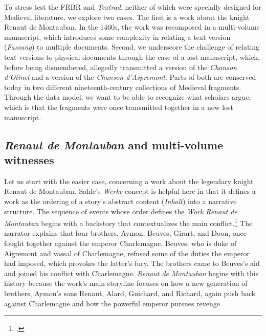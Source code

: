 To stress test the FRBR and \textit{Textrad}, neither of which were specially designed for Medieval literature, we explore two cases. The first is a work about the knight Renaut de Montauban. In the 1460s, the work was recomposed in a multi-volume manuscript, which introduces some complexity in relating a text version (\textit{Fassung}) to multiple documents. Second, we underscore the challenge of relating text versions to physical documents through the case of a lost manuscript, which, before being dismembered, allegedly transmitted a version of the \textit{Chanson d'Otinel} and a version of the \textit{Chanson d'Aspremont}. Parts of both are conserved today in two different nineteenth-century collections of Medieval fragments. Through the data model, we want to be able to recognize what scholars argue, which is that the fragments were once transmitted together in a now lost manuscript.

\subsection{\textit{Renaut de Montauban} and multi-volume witnesses}

Let us start with the easier case, concerning a work about the legendary knight Renaut de Montauban. Sahle's \textit{Werke} concept is helpful here in that it defines a work as the ordering of a story's abstract content (\textit{Inhalt}) into a narrative structure. The sequence of events whose order defines the \textit{Work} \textit{Renaut de Montauban} begins with a backstory that contextualizes the main conflict.\footcite[Whether this opening section constitutes a prologue, in alignment with the generic expectations of a prologue for \textit{chansons de geste}, is the subject of scholarly debate.][]{Leverage2000} The narrator explains that four brothers, Aymon, Beuves, Girart, and Doon, once fought together against the emperor Charlemagne. Beuves, who is duke of Aigremont and vassal of Charlemagne, refused some of the duties the emperor had imposed, which provokes the latter's fury. The brothers came to Beuves's aid and joined his conflict with Charlemagne. \textit{Renaut de Montauban} begins with this history because the work's main storyline focuses on how a new generation of brothers, Aymon's sons Renaut, Alard, Guichard, and Richard, again push back against Charlemagne and how the powerful emperor pursues revenge.\footnotemark{}

